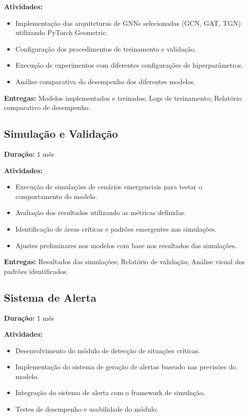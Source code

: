 \textbf{Atividades:}
\begin{itemize}[noitemsep]
    \item Implementação das arquiteturas de \gls{GNN}s selecionadas (GCN, GAT, TGN) utilizando PyTorch Geometric.
    \item Configuração dos procedimentos de treinamento e validação.
    \item Execução de experimentos com diferentes configurações de hiperparâmetros.
    \item Análise comparativa do desempenho dos diferentes modelos.
\end{itemize}

\textbf{Entregas:} Modelos implementados e treinados; Logs de treinamento; Relatório comparativo de desempenho.

\subsection{Simulação e Validação}
\textbf{Duração:} 1 mês

\textbf{Atividades:}
\begin{itemize}[noitemsep]
    \item Execução de simulações de cenários emergenciais para testar o comportamento do modelo.
    \item Avaliação dos resultados utilizando as métricas definidas.
    \item Identificação de áreas críticas e padrões emergentes nas simulações.
    \item Ajustes preliminares nos modelos com base nos resultados das simulações.
\end{itemize}

\textbf{Entregas:} Resultados das simulações; Relatório de validação; Análise visual dos padrões identificados.

\subsection{Sistema de Alerta}
\textbf{Duração:} 1 mês

\textbf{Atividades:}
\begin{itemize}[noitemsep]
    \item Desenvolvimento do módulo de detecção de situações críticas.
    \item Implementação do sistema de geração de alertas baseado nas previsões do modelo.
    \item Integração do sistema de alerta com o framework de simulação.
    \item Testes de desempenho e usabilidade do módulo.
\end{itemize}

